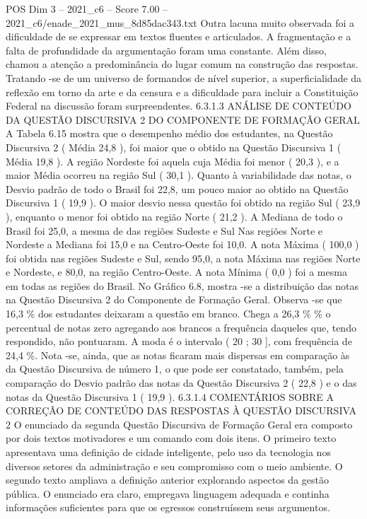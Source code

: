 \begin{textsample}{POS Dim 3 – 2021\_c6 – Score 7.00 – 2021\_c6/enade\_2021\_mus\_8d85dac343.txt}
Outra lacuna muito observada foi a dificuldade de se expressar em textos fluentes e articulados.
A fragmentação e a falta de profundidade da argumentação foram uma constante.
Além disso, chamou a atenção a predominância do lugar comum na construção das respostas.
Tratando -se de um universo de formandos de nível superior, a superficialidade da reflexão em torno da arte e da censura e a dificuldade para incluir a Constituição Federal na discussão foram surpreendentes. 6.3.1.3 ANÁLISE DE CONTEÚDO DA QUESTÃO DISCURSIVA 2 DO COMPONENTE DE FORMAÇÃO GERAL A Tabela 6.15 mostra que o desempenho médio dos estudantes, na Questão Discursiva 2 ( Média 24,8 ), foi maior que o obtido na Questão Discursiva 1 ( Média 19,8 ).
A região Nordeste foi aquela cuja Média foi menor ( 20,3 ), e a maior Média ocorreu na região Sul ( 30,1 ).
Quanto à variabilidade das notas, o Desvio padrão de todo o Brasil foi 22,8, um pouco maior ao obtido na Questão Discursiva 1 ( 19,9 ).
O maior desvio nessa questão foi obtido na região Sul ( 23,9 ), enquanto o menor foi obtido na região Norte ( 21,2 ).
A Mediana de todo o Brasil foi 25,0, a mesma de das regiões Sudeste e Sul Nas regiões Norte e Nordeste a Mediana foi 15,0 e na Centro-Oeste foi 10,0.
A nota Máxima ( 100,0 ) foi obtida nas regiões Sudeste e Sul, sendo 95,0, a nota Máxima nas regiões Norte e Nordeste, e 80,0, na região Centro-Oeste.
A nota Mínima ( 0,0 ) foi a mesma em todas as regiões do Brasil.
No Gráfico 6.8, mostra -se a distribuição das notas na Questão Discursiva 2 do Componente de Formação Geral.
Observa -se que 16,3 \% dos estudantes deixaram a questão em branco.
Chega a 26,3 \% \% o percentual de notas zero agregando aos brancos a frequência daqueles que, tendo respondido, não pontuaram.
A moda é o intervalo ( 20 ; 30 ], com frequência de 24,4 \%.
Nota -se, ainda, que as notas ficaram mais dispersas em comparação às da Questão Discursiva de número 1, o que pode ser constatado, também, pela comparação do Desvio padrão das notas da Questão Discursiva 2 ( 22,8 ) e o das notas da Questão Discursiva 1 ( 19,9 ). 6.3.1.4 COMENTÁRIOS SOBRE A CORREÇÃO DE CONTEÚDO DAS RESPOSTAS À QUESTÃO DISCURSIVA 2 O enunciado da segunda Questão Discursiva de Formação Geral era composto por dois textos motivadores e um comando com dois itens.
O primeiro texto apresentava uma definição de cidade inteligente, pelo uso da tecnologia nos diversos setores da administração e seu compromisso com o meio ambiente.
O segundo texto ampliava a definição anterior explorando aspectos da gestão pública.
O enunciado era claro, empregava linguagem adequada e continha informações suficientes para que os egressos construíssem seus argumentos.

\end{textsample}
